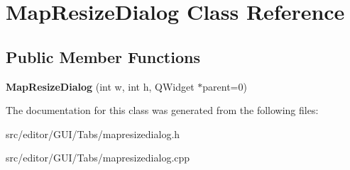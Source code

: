 \hypertarget{class_map_resize_dialog}{\section{\-Map\-Resize\-Dialog \-Class \-Reference}
\label{class_map_resize_dialog}
}
\subsection*{\-Public \-Member \-Functions}
\begin{DoxyCompactItemize}
\item 
\hypertarget{class_map_resize_dialog_a94fbe6945fc72c26fa0df04b5056e80c}{{\bfseries \-Map\-Resize\-Dialog} (int w, int h, \-Q\-Widget $\ast$parent=0)}\label{class_map_resize_dialog_a94fbe6945fc72c26fa0df04b5056e80c}

\end{DoxyCompactItemize}


\-The documentation for this class was generated from the following files\-:\begin{DoxyCompactItemize}
\item 
src/editor/\-G\-U\-I/\-Tabs/mapresizedialog.\-h\item 
src/editor/\-G\-U\-I/\-Tabs/mapresizedialog.\-cpp\end{DoxyCompactItemize}
